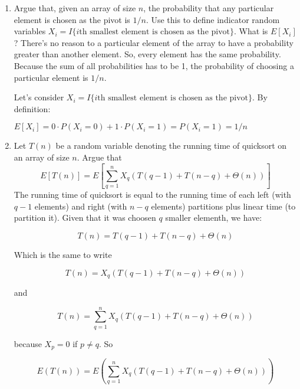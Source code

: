 \documentclass{article}
\begin{document}
\begin{enumerate}[label=(\alph*)]
  \item Argue that, given an array of size $n$, the probability that any particular element is chosen as the pivot is $1/n$. Use this to define indicator random variables $X_i = I \{i\mbox{th smallest element is chosen as the pivot}\}$. What is $E[X_i]$?
  \bigbreak
  There's no reason to a particular element of the array to have a probability greater than another element. So, every element has the same probability. Because the sum of all probabilities has to be 1, the probability of choosing a particular element is $1/n$.
  
  Let's consider $X_i = I \{i\mbox{th smallest element is chosen as the pivot}\}$. By definition:
  
  $E[X_i] = 0 \cdot P(X_i = 0) + 1 \cdot P(X_i = 1) = P(X_i = 1) = 1/n$
  \item Let $T(n)$ be a random variable denoting the running time of quicksort on an array of size $n$. Argue that
  \begin{equation}
    E[T(n)]=E\left[\sum_{q=1}^{n}X_q(T(q-1)+T(n-q)+\Theta(n))\right]  
    \label{eq:1}
  \end{equation}
  \bigbreak
  The running time of quicksort is equal to the running time of each left (with $q - 1$ elements) and right (with $n - q$ elements) partitions plus linear time (to partition it). Given that it was choosen $q$ smaller elementh, we have:
  
  $$T(n) = T(q - 1) + T(n - q) + \Theta(n)$$
  
  Which is the same to write
  
   $$T(n) = X_q(T(q - 1) + T(n - q) + \Theta(n))$$
   
   and
   
   $$T(n) = \sum_{q=1}^n X_q(T(q - 1) + T(n - q) + \Theta(n))$$
   
   because $X_p = 0$ if $p\neq q$. So
   
   $$E(T(n)) = E\left(\sum_{q=1}^n X_q(T(q - 1) + T(n - q) + \Theta(n))\right)$$
  

\end{enumerate}
\end{document}
